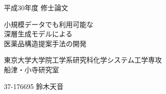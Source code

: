 \begin{titlepage}
\begin{center}
{\huge 平成30年度 修士論文}

\Huge{小規模データでも利用可能な\\深層生成モデルによる\\医薬品構造提案手法の開発}

\Large{東京大学大学院工学系研究科化学システム工学専攻\\船津・小寺研究室}

\huge{37-176695 鈴木天音}
\end{center}
\end{titlepage}
